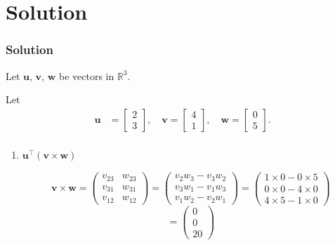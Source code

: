 \documentclass{beamer}
\theoremstyle{remark}
\numberwithin{equation}{section}
\begin{document}
\section{Solution}
\begin{frame}[fragile]
    \frametitle{Solution}
Let $\mathbf{u}$, $\mathbf{v}$, $\mathbf{w}$ be vectors in $\mathbb{R}^3$.

   Let \begin{align}
    \mathbf{u} &= \begin{bmatrix} 2 \\ 3 \end{bmatrix}, \quad
  \mathbf{v} = \begin{bmatrix} 4 \\ 1 \end{bmatrix}, \quad
  \mathbf{w} = \begin{bmatrix} 0 \\ 5 \end{bmatrix}.
  \\
\end{align}
\begin{enumerate}[label=\alph*)]
  \item \( \mathbf{u}^\top (\mathbf{v} \times \mathbf{w}) \)

\[
\mathbf{v} \times \mathbf{w} =
\begin{pmatrix}
v_{23} & w_{23} \\
v_{31} & w_{31} \\
v_{12} & w_{12}
\end{pmatrix}
=
\begin{pmatrix}
v_2 w_3 - v_3 w_2 \\
v_3 w_1 - v_1 w_3 \\
v_1 w_2 - v_2 w_1
\end{pmatrix}
=
\begin{pmatrix}
1 \times 0 - 0 \times 5 \\
0 \times 0 - 4 \times 0 \\
4 \times 5 - 1 \times 0
\end{pmatrix}
\]
\[
=
\begin{pmatrix}
0 \\
0 \\
20
\end{pmatrix}
\]

\end{enumerate}
\end{frame}
\end{document}
